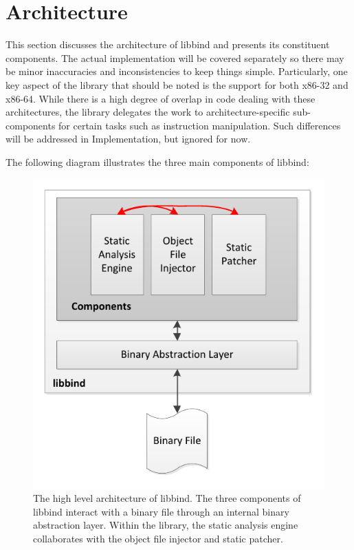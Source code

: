 \chapter{Architecture}

This section discusses the architecture of libbind  and presents its constituent components. The actual implementation will be covered separately so there may be minor inaccuracies and inconsistencies to keep things simple. Particularly, one key aspect of the library that should be noted is the support for both x86-32 and x86-64. While there is a high degree of overlap in code dealing with these architectures, the library delegates the work to architecture-specific sub-components for certain tasks such as instruction manipulation. Such differences will be addressed in Implementation, but ignored for now.

The following diagram illustrates the three main components of libbind:

\begin{figure}[H]
 \centering
 \includegraphics{Architecture.pdf}
 \caption[Architecture]{The high level architecture of libbind. The three components of libbind interact with a binary file through an internal binary abstraction layer. Within the library, the static analysis engine collaborates with the object file injector and static patcher.}
\end{figure}

